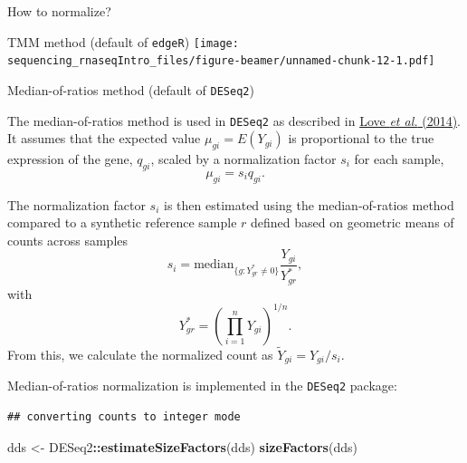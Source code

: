 \documentclass[ignorenonframetext,]{beamer}
\newenvironment{Shaded}{\begin{snugshade}}{\end{snugshade}}
\newcommand{\CommentTok}[1]{\textcolor[rgb]{0.56,0.35,0.01}{\textit{#1}}}
\newcommand{\DataTypeTok}[1]{\textcolor[rgb]{0.13,0.29,0.53}{#1}}
\newcommand{\DecValTok}[1]{\textcolor[rgb]{0.00,0.00,0.81}{#1}}
\newcommand{\KeywordTok}[1]{\textcolor[rgb]{0.13,0.29,0.53}{\textbf{#1}}}
\newcommand{\NormalTok}[1]{#1}
\newcommand{\OperatorTok}[1]{\textcolor[rgb]{0.81,0.36,0.00}{\textbf{#1}}}
\newcommand{\StringTok}[1]{\textcolor[rgb]{0.31,0.60,0.02}{#1}}
\begin{document}
\begin{frame}[fragile]
\begin{block}{How to normalize?}
\begin{block}{TMM method (default of \texttt{edgeR})}
\texttt{[image: sequencing\_rnaseqIntro\_files/figure-beamer/unnamed-chunk-12-1.pdf]}

\end{block}

\end{block}

\begin{block}{Median-of-ratios method (default of \texttt{DESeq2})}

The median-of-ratios method is used in \texttt{DESeq2} as described in
\href{https://genomebiology.biomedcentral.com/articles/10.1186/s13059-014-0550-8}{Love
\emph{et al.} (2014)}. It assumes that the expected value
\(\mu_{gi} = E(Y_{gi})\) is proportional to the true expression of the
gene, \(q_{gi}\), scaled by a normalization factor \(s_{i}\) for each
sample, \[ \mu_{gi} = s_{i}q_{gi}. \]

The normalization factor \(s_{i}\) is then estimated using the
median-of-ratios method compared to a synthetic reference sample \(r\)
defined based on geometric means of counts across samples \[
s_i = \text{median}_{\{{g:Y^{*}_{gr} \ne 0}\}} \frac{Y_{gi}}{Y^{*}_{gr}},
\] with \[ Y^{*}_{gr} = \left( \prod_{i=1}^n Y_{gi} \right)^{1/n}. \]
From this, we calculate the normalized count as
\(\tilde{Y}_{gi} = Y_{gi} / s_{i}\).

Median-of-ratios normalization is implemented in the \texttt{DESeq2}
package:

\begin{Shaded}
\end{Shaded}

\begin{verbatim}
## converting counts to integer mode
\end{verbatim}

\begin{Shaded}
\begin{Highlighting}[]
\NormalTok{dds <-}\StringTok{ }\NormalTok{DESeq2}\OperatorTok{::}\KeywordTok{estimateSizeFactors}\NormalTok{(dds)}
\KeywordTok{sizeFactors}\NormalTok{(dds)}
\end{Highlighting}
\end{Shaded}


\end{block}
\end{frame}
\end{document}
